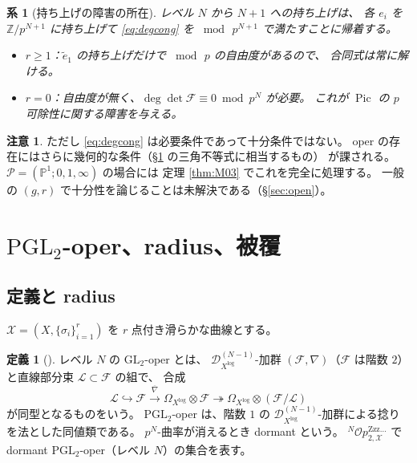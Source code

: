 \documentclass[a4paper,11pt]{ltjsarticle}
\theoremstyle{plain}
\newtheorem{corollary}[theorem]{系}
\theoremstyle{definition}
\newtheorem{definition}[theorem]{定義}
\newtheorem{remark}[theorem]{注意}
\newcommand{\bbP}{\mathbb{P}}
\newcommand{\bbZ}{\mathbb{Z}}
\newcommand{\cD}{\mathcal{D}}
\newcommand{\cF}{\mathcal{F}}
\newcommand{\cL}{\mathcal{L}}
\newcommand{\sX}{\mathscr{X}}
\newcommand{\sP}{\mathscr{P}}
\newcommand{\Pic}{\operatorname{Pic}}
\newcommand{\Op}{\mathcal{O}p}
\newcommand{\Zzz}{\mathrm{Zzz\dots}}
\newcommand{\Dlog}[1]{\cD^{(#1)}_{X^{\log}}}
\begin{document}
\begin{corollary}[持ち上げの障害の所在]\label{cor:obstruction}
レベル $N$ から $N+1$ への持ち上げは、
各 $e_i$ を $\bbZ/p^{N+1}$ に持ち上げて \eqref{eq:degcong} を
$\bmod\,p^{N+1}$ で満たすことに帰着する。
\begin{itemize}[leftmargin=1.6em]
\item $r\ge1$：$\tilde e_1$ の持ち上げだけで $\bmod\,p$ の自由度があるので、
      合同式は常に解ける。
\item $r=0$：自由度が無く、$\deg\det\cF\equiv0\bmod p^{N}$ が必要。
      これが $\Pic$ の $p$ 可除性に関する障害を与える。
\end{itemize}
\end{corollary}

\begin{remark}
ただし \eqref{eq:degcong} は必要条件であって十分条件ではない。
oper の存在にはさらに幾何的な条件（\S\ref{sec:opers} の三角不等式に相当するもの）
が課される。$\sP=(\bbP^1;0,1,\infty)$ の場合には
定理 \ref{thm:M03} でこれを完全に処理する。
一般の $(g,r)$ で十分性を論じることは未解決である（\S\ref{sec:open}）。
\end{remark}

\section{$\mathrm{PGL}_2$-oper、radius、被覆}\label{sec:opers}

\subsection{定義と radius}

$\sX=(X,\{\sigma_i\}_{i=1}^r)$ を $r$ 点付き滑らかな曲線とする。

\begin{definition}[{\cite[Def.~4.2.1, 4.2.5]{Wak}}]
レベル $N$ の $\mathrm{GL}_2$-oper とは、
$\Dlog{N-1}$-加群 $(\cF,\nabla)$（$\cF$ は階数 $2$）と直線部分束 $\cL\subset\cF$ の組で、
合成
\[
  \cL\hookrightarrow\cF\xrightarrow{\ \overline\nabla\ }
  \Omega_{X^{\log}}\otimes\cF\twoheadrightarrow\Omega_{X^{\log}}\otimes(\cF/\cL)
\]
が同型となるものをいう。
$\mathrm{PGL}_2$-oper は、階数 $1$ の $\Dlog{N-1}$-加群による捻りを法とした同値類である。
$p^N$-曲率が消えるとき dormant という。
${}^N\Op^{\Zzz}_{2,\sX}$ で dormant $\mathrm{PGL}_2$-oper（レベル $N$）の集合を表す。
\end{definition}
\end{document}
